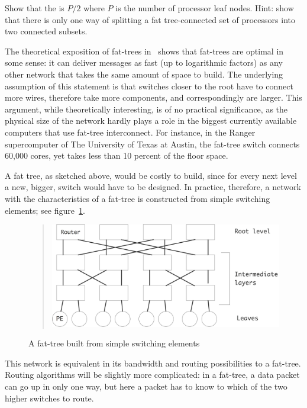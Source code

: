 \begin{exercise}
Show that the  is $P/2$
where $P$ is the number of processor leaf nodes. Hint: show that there
is only one way of splitting a fat tree-connected set of processors
into two connected subsets.
\end{exercise}

The theoretical exposition of fat-trees in~\cite{Leiserson:fattree}
shows that fat-trees are optimal in some sense: it can deliver
messages as fast (up to logarithmic factors) as any other network that
takes the same amount of space to build. The underlying assumption of
this statement is that switches closer to the root have to connect
more wires, therefore take more components, and correspondingly are
larger. 
%
This argument, while theoretically interesting, is of no practical
significance, as the physical size of the network hardly plays a role
in the biggest currently available computers that use fat-tree
interconnect. For instance, in the Ranger supercomputer of The
University of Texas at Austin, the fat-tree switch connects 60,000
cores, yet takes less than 10 percent of the floor space.

A fat tree, as sketched above, would be costly to build, since for
every next level a new, bigger, switch would have to be designed. In
practice, therefore, a network with the characteristics of a fat-tree
is constructed from simple switching elements; see
figure~\ref{fig:fattreeclos}.
\begin{figure}
  \begin{quote}
    \includegraphics[scale=.11]{graphics/fattree-clos}
  \end{quote}
  \caption{A fat-tree built from simple switching elements}
  \label{fig:fattreeclos}
\end{figure}
This network is equivalent in its bandwidth and routing possibilities
to a fat-tree. Routing algorithms will be slightly more complicated:
in a fat-tree, a data packet can go up in only one way, but here a
packet has to know to which of the two higher switches to route.

